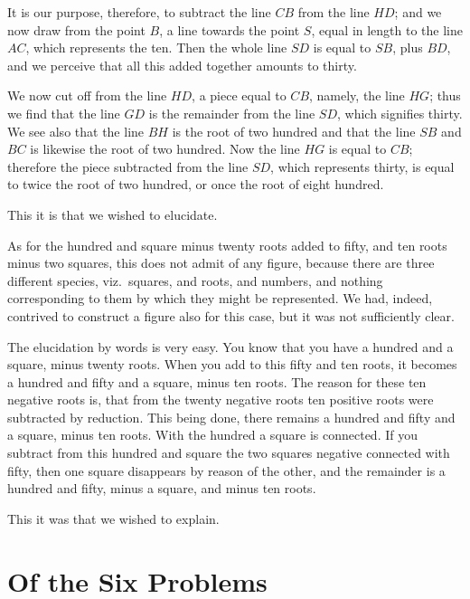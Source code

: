 It is our purpose, therefore, to subtract the line $CB$ from the line $HD$; and we now draw from the point $B$, a line towards the point $S$, equal in length to the line $AC$, which represents the ten. Then the whole line $SD$ is equal to $SB$, plus $BD$, and we perceive that all this added together amounts to thirty.

We now cut off from the line $HD$, a piece equal to $CB$, namely, the line $HG$; thus we find that the line $GD$ is the remainder from the line $SD$, which signifies thirty. We see also that the line $BH$ is the root of two hundred and that the line $SB$ and $BC$ is likewise the root of two hundred. Now the line $HG$ is equal to $CB$; therefore the piece subtracted from the line $SD$, which represents thirty, is equal to twice the root of two hundred, or once the root of eight hundred.

This it is that we wished to elucidate.

\vspace{0.3cm}
As for the hundred and square minus twenty roots added to fifty, and ten roots minus two squares, this does not admit of any figure, because there are three different species, viz.~squares, and roots, and numbers, and nothing corresponding to them by which they might be represented. We had, indeed, contrived to construct a figure also for this case, but it was not sufficiently clear.

The elucidation by words is very easy. You know that you have a hundred and a square, minus twenty roots. When you add to this fifty and ten roots, it becomes a hundred and fifty and a square, minus ten roots. The reason for these ten negative roots is, that from the twenty negative roots ten positive roots were subtracted by reduction. This being done, there remains a hundred and fifty and a square, minus ten roots. With the hundred a square is connected. If you subtract from this hundred and square the two squares negative connected with fifty, then one square disappears by reason of the other, and the remainder is a hundred and fifty, minus a square, and minus ten roots.

This it was that we wished to explain.

\clearpage

\section*{Of the Six Problems}

